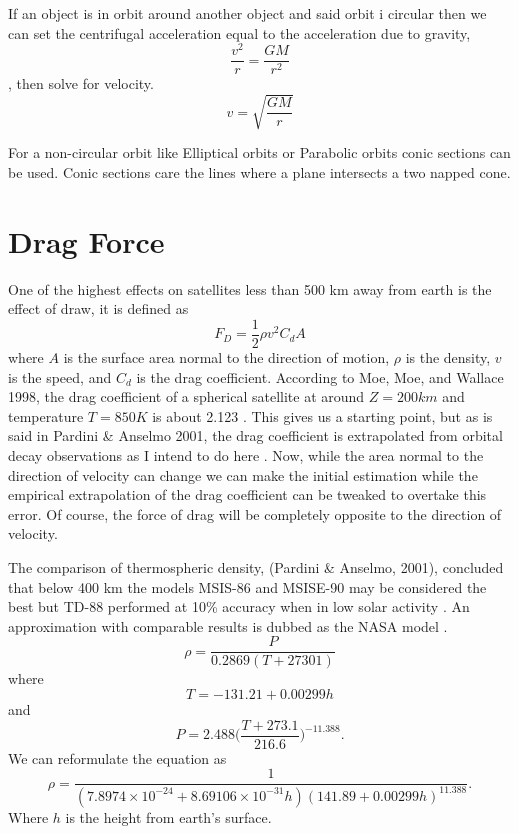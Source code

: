\documentclass{article}
\begin{document}
If an object is in orbit around another object and said orbit i circular then we can set the centrifugal acceleration equal to the acceleration due to gravity, $$\frac{v^2}{r}=\frac{GM}{r^2}$$, then solve for velocity.
\begin{equation}
v=\sqrt{\frac{GM}{r}}
\end{equation}

For a non-circular orbit like Elliptical orbits or Parabolic orbits conic sections can be used. Conic sections care the lines where a plane intersects a two napped cone.

\section{Drag Force}

One of the highest effects on satellites less than 500 km away from earth is the effect of draw, it is defined as $$F_D=\frac{1}{2}\rho v^2 C_d A$$ where $A$ is the surface area normal to the direction of motion, $\rho$ is the density, $v$ is the speed, and $C_d$ is the drag coefficient. According to Moe, Moe, and Wallace 1998, the drag coefficient of a spherical satellite at around $Z=200km$ and temperature $T=850K$ is about 2.123 \cite{moe_moe_wallace_1998}. This gives us a starting point, but as is said in Pardini \& Anselmo 2001, the drag coefficient is extrapolated from orbital decay observations as I intend to do here \cite{pardini_anselmo_2001}. Now, while the area normal to the direction of velocity can change we can make the initial estimation while the empirical extrapolation of the drag coefficient can be tweaked to overtake this error. Of course, the force of drag will be completely opposite to the direction of velocity.

The comparison of thermospheric density, (Pardini \& Anselmo, 2001), concluded that below 400 km the models MSIS-86 and MSISE-90 may be considered the best but TD-88 performed at 10\% accuracy when in low solar activity \cite{pardini_anselmo_2001}. An approximation with comparable results is dubbed as the NASA model \cite{brito_celestino_moraes_2015}\cite{nasa}.
\begin{equation}
\rho=\frac{P}{0.2869(T+27301)}
\end{equation} where $$T=-131.21+0.00299h$$ and $$P=2.488\bigg(\frac{T+273.1}{216.6}\bigg)^{-11.388}.$$
We can reformulate the equation as 
\begin{equation}
\rho=\frac{1}{(7.8974\times10^{-24}+8.69106\times10^{-31}h)(141.89+0.00299h)^{11.388}}.
\end{equation} Where $h$ is the height from earth's surface.
\end{document}
